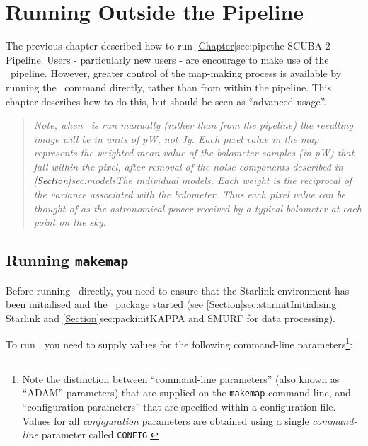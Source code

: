 \chapter{Running  Outside the Pipeline}
\label{sec:manual}

The previous chapter described how to run \cref{Chapter}{sec:pipe}{the
SCUBA-2 Pipeline}. Users - particularly new users - are encourage to make
use of the \oracdr\ pipeline. However, greater control of the map-making
process is available by running the \makemap\ command directly, rather
than from within the pipeline. This chapter describes how to do this, but
should be seen as ``advanced usage''.

\begin{quote}
\emph{
Note, when \makemap\ is run manually (rather than from the pipeline) the
resulting image will be in units of pW, not Jy. Each pixel value
in the map represents the weighted mean value of the bolometer samples
(in pW) that fall within the pixel, after removal of the noise components
described in \cref{Section}{sec:models}{The individual models}. Each
weight is the reciprocal of the variance associated with the bolometer.
Thus each pixel value can be thought of as the astronomical power
received by a typical bolometer at each point on the sky.
}
\end{quote}

\section{Running \texttt{makemap}}

Before running \makemap\ directly, you need to ensure that the Starlink
environment has been initialised and the \smurf\ package started (see
\cref{Section}{sec:starinit}{Initialising Starlink} and
\cref{Section}{sec:packinit}{KAPPA and SMURF for data processing}).

To run \makemap, you  need to supply values for the following
command-line parameters\footnote{Note the distinction between
``command-line parameters'' (also known as ``ADAM'' parameters) that are
supplied on the \texttt{makemap} command line, and ``configuration parameters''
that are specified within a configuration file. Values for all
\emph{configuration} parameters are obtained using a single \emph{command-line}
parameter called \texttt{CONFIG}.}:

